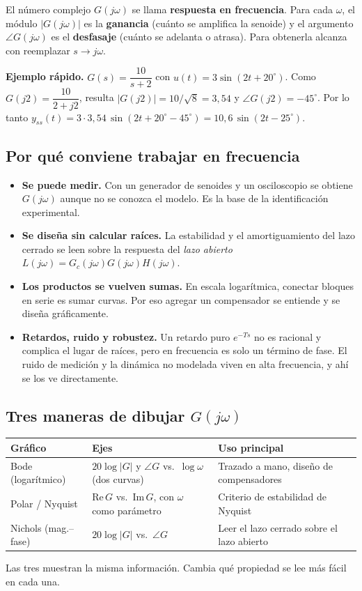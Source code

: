 \documentclass[11pt,a4paper]{article}
\newcommand{\jw}{j\omega}
\begin{document}
El número complejo $G(\jw)$ se llama \textbf{respuesta en frecuencia}. Para cada $\omega$, el módulo $|G(\jw)|$
es la \textbf{ganancia} (cuánto se amplifica la senoide) y el argumento $\angle G(\jw)$ es el
\textbf{desfasaje} (cuánto se adelanta o atrasa). Para obtenerla alcanza con reemplazar $s\to\jw$.

\textbf{Ejemplo rápido.} $G(s)=\dfrac{10}{s+2}$ con $u(t)=3\sin(2t+20^\circ)$. Como $G(j2)=\dfrac{10}{2+j2}$, resulta
$|G(j2)|=10/\sqrt8=3{,}54$ y $\angle G(j2)=-45^\circ$. Por lo tanto $y_{ss}(t)=3\cdot3{,}54\,\sin(2t+20^\circ-45^\circ)=10{,}6\,\sin(2t-25^\circ)$.

\subsection{Por qué conviene trabajar en frecuencia}
\begin{itemize}
\item \textbf{Se puede medir.} Con un generador de senoides y un osciloscopio se obtiene $G(\jw)$
      aunque no se conozca el modelo. Es la base de la identificación experimental.
\item \textbf{Se diseña sin calcular raíces.} La estabilidad y el amortiguamiento del lazo cerrado se leen
      sobre la respuesta del \emph{lazo abierto} $L(\jw)=G_c(\jw)G(\jw)H(\jw)$.
\item \textbf{Los productos se vuelven sumas.} En escala logarítmica, conectar bloques en serie es sumar
      curvas. Por eso agregar un compensador se entiende y se diseña gráficamente.
\item \textbf{Retardos, ruido y robustez.} Un retardo puro $e^{-Ts}$ no es racional y complica el lugar de raíces,
      pero en frecuencia es solo un término de fase. El ruido de medición y la dinámica no modelada viven en alta
      frecuencia, y ahí se los ve directamente.
\end{itemize}

\subsection{Tres maneras de dibujar $G(\jw)$}
\begin{center}
\small
\begin{tabular}{@{}lll@{}}
\toprule
Gráfico & Ejes & Uso principal\\
\midrule
Bode (logarítmico) & $20\log|G|$ y $\angle G$ vs.\ $\log\omega$ (dos curvas) & Trazado a mano, diseño de compensadores\\
Polar / Nyquist & $\mathrm{Re}\,G$ vs.\ $\mathrm{Im}\,G$, con $\omega$ como parámetro & Criterio de estabilidad de Nyquist\\
Nichols (mag.--fase) & $20\log|G|$ vs.\ $\angle G$ & Leer el lazo cerrado sobre el lazo abierto\\
\bottomrule
\end{tabular}
\end{center}
Las tres muestran la misma información. Cambia qué propiedad se lee más fácil en cada una.
\end{document}
